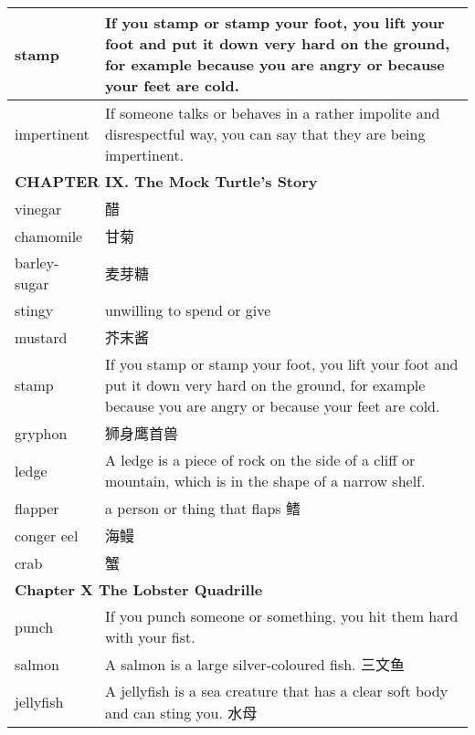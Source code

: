 \documentclass{article}
\begin{document}
\begin{center}
\begin{longtable}{|l|p{9cm}|}
\hline
stamp
&
If you stamp or stamp your foot, you lift your foot and put it down very hard on the ground, for example because you are angry or because your feet are cold.
\\

\hline
impertinent
&
If someone talks or behaves in a rather impolite and disrespectful way, you can say that they are being impertinent.
\\

\hline
\multicolumn{2}{|l|}{\textbf{CHAPTER IX. The Mock Turtle’s Story}}\\

\hline
vinegar
&
醋
\\

\hline
chamomile
&
甘菊
\\

\hline
barley-sugar
&
麦芽糖
\\

\hline
stingy
&
unwilling to spend or give
\\

\hline
mustard
&
芥末酱
\\

\hline
stamp
&
If you stamp or stamp your foot, you lift your foot and put it down very hard on the ground, for example because you are angry or because your feet are cold.
\\

\hline
gryphon
&
狮身鹰首兽
\\

\hline
ledge
&
A ledge is a piece of rock on the side of a cliff or mountain, which is in the shape of a narrow shelf.
\\

\hline
flapper
&
a person or thing that flaps 鳍
\\

\hline
conger eel
&
海鳗
\\

\hline
crab
&
蟹
\\

\hline
\multicolumn{2}{|l|}{\textbf{Chapter X The Lobster Quadrille}}\\

\hline
punch
&
If you punch someone or something, you hit them hard with your fist.
\\

\hline
salmon
&
A salmon is a large silver-coloured fish. 三文鱼
\\

\hline
jellyfish
&
A jellyfish is a sea creature that has a clear soft body and can sting you. 水母
\\


\end{longtable}
\end{center}
\end{document}

